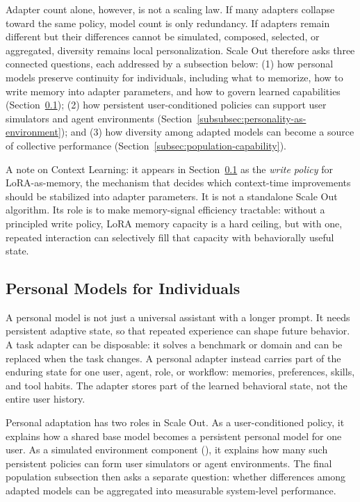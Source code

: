 \documentclass{llmxive}
\providecommand{\pony}[1]{#1}
\begin{document}
\pony{Adapter count alone, however, is not a scaling law. If many adapters collapse toward the same policy, model count is only redundancy. If adapters remain different but their differences cannot be simulated, composed, selected, or aggregated, diversity remains local personalization. Scale Out therefore asks three connected questions, each addressed by a subsection below: (1) how personal models preserve continuity for individuals, including what to memorize, how to write memory into adapter parameters, and how to govern learned capabilities (Section~\ref{subsec:personality-adapters}); (2) how persistent user-conditioned policies can support user simulators and agent environments (Section~\ref{subsubsec:personality-as-environment}); and (3) how diversity among adapted models can become a source of collective performance (Section~\ref{subsec:population-capability}).}

\pony{A note on Context Learning: it appears in Section~\ref{subsec:personality-adapters} as the \emph{write policy} for LoRA-as-memory, the mechanism that decides which context-time improvements should be stabilized into adapter parameters. It is not a standalone Scale Out algorithm. Its role is to make memory-signal efficiency tractable: without a principled write policy, LoRA memory capacity is a hard ceiling, but with one, repeated interaction can selectively fill that capacity with behaviorally useful state.}

\subsection{\pony{Personal Models for Individuals}}\label{subsec:personality-adapters}

\pony{A personal model is not just a universal assistant with a longer prompt. It needs persistent adaptive state, so that repeated experience can shape future behavior. A task adapter can be disposable: it solves a benchmark or domain and can be replaced when the task changes. A personal adapter instead carries part of the enduring state for one user, agent, role, or workflow: memories, preferences, skills, and tool habits. The adapter stores part of the learned behavioral state, not the entire user history.}

\pony{Personal adaptation has two roles in Scale Out. As a user-conditioned policy, it explains how a shared base model becomes a persistent personal model for one user. As a simulated environment component (\Cref{subsubsec:personality-as-environment}), it explains how many such persistent policies can form user simulators or agent environments. The final population subsection then asks a separate question: whether differences among adapted models can be aggregated into measurable system-level performance.}
\end{document}
